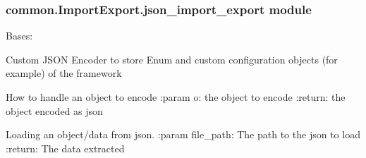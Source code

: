 \documentclass[letterpaper,10pt,english]{sphinxmanual}
\begin{document}
\subsubsection{common.ImportExport.json\_import\_export module}
\label{\detokenize{common.ImportExport:module-common.ImportExport.json_import_export}}\label{\detokenize{common.ImportExport:common-importexport-json-import-export-module}}

\begin{fulllineitems}
\label{\detokenize{common.ImportExport:common.ImportExport.json_import_export.Custom_JSON_Encoder}}
Bases: 

Custom JSON Encoder to store Enum and custom configuration objects (for example) of the framework

\begin{fulllineitems}
\label{\detokenize{common.ImportExport:common.ImportExport.json_import_export.Custom_JSON_Encoder.default}}
How to handle an object to encode
:param o: the object to encode
:return: the object encoded as json

\end{fulllineitems}


\end{fulllineitems}


\begin{fulllineitems}
\label{\detokenize{common.ImportExport:common.ImportExport.json_import_export.load_json}}
Loading an object/data from json.
:param file\_path: The path to the json to load
:return: The data extracted

\end{fulllineitems}
\end{document}

